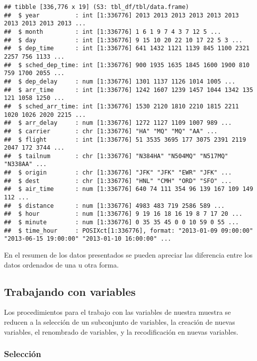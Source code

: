 \documentclass[
]{book}
\begin{document}
\begin{verbatim}
## tibble [336,776 x 19] (S3: tbl_df/tbl/data.frame)
##  $ year          : int [1:336776] 2013 2013 2013 2013 2013 2013 2013 2013 2013 2013 ...
##  $ month         : int [1:336776] 1 6 1 9 7 4 3 7 12 5 ...
##  $ day           : int [1:336776] 9 15 10 20 22 10 17 22 5 3 ...
##  $ dep_time      : int [1:336776] 641 1432 1121 1139 845 1100 2321 2257 756 1133 ...
##  $ sched_dep_time: int [1:336776] 900 1935 1635 1845 1600 1900 810 759 1700 2055 ...
##  $ dep_delay     : num [1:336776] 1301 1137 1126 1014 1005 ...
##  $ arr_time      : int [1:336776] 1242 1607 1239 1457 1044 1342 135 121 1058 1250 ...
##  $ sched_arr_time: int [1:336776] 1530 2120 1810 2210 1815 2211 1020 1026 2020 2215 ...
##  $ arr_delay     : num [1:336776] 1272 1127 1109 1007 989 ...
##  $ carrier       : chr [1:336776] "HA" "MQ" "MQ" "AA" ...
##  $ flight        : int [1:336776] 51 3535 3695 177 3075 2391 2119 2047 172 3744 ...
##  $ tailnum       : chr [1:336776] "N384HA" "N504MQ" "N517MQ" "N338AA" ...
##  $ origin        : chr [1:336776] "JFK" "JFK" "EWR" "JFK" ...
##  $ dest          : chr [1:336776] "HNL" "CMH" "ORD" "SFO" ...
##  $ air_time      : num [1:336776] 640 74 111 354 96 139 167 109 149 112 ...
##  $ distance      : num [1:336776] 4983 483 719 2586 589 ...
##  $ hour          : num [1:336776] 9 19 16 18 16 19 8 7 17 20 ...
##  $ minute        : num [1:336776] 0 35 35 45 0 0 10 59 0 55 ...
##  $ time_hour     : POSIXct[1:336776], format: "2013-01-09 09:00:00" "2013-06-15 19:00:00" "2013-01-10 16:00:00" ...
\end{verbatim}

En el resumen de los datos presentados se pueden apreciar las diferencia entre los datos ordenados de una u otra forma.

\hypertarget{trabajando-con-variables}{%
\subsection{Trabajando con variables}\label{trabajando-con-variables}}

Los procedimientos para el trabajo con las variables de nuestra muestra se reducen a la selección de un subconjunto de variables, la creación de nuevas variables, el renombrado de variables, y la recodificación en nuevas variables.

\hypertarget{selecciuxf3n}{%
\subsubsection{Selección}\label{selecciuxf3n}}
\end{document}

